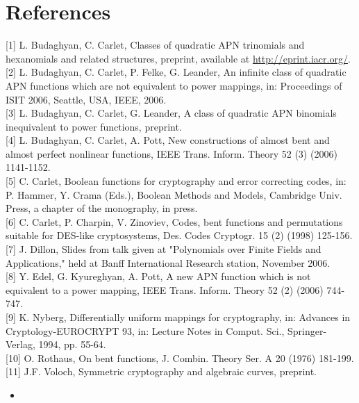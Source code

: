 \documentclass[10pt]{article}
\begin{document}
\section*{References}
[1] L. Budaghyan, C. Carlet, Classes of quadratic APN trinomials and hexanomials and related structures, preprint, available at \href{http://eprint.iacr.org/}{http://eprint.iacr.org/}.\\[0pt]
[2] L. Budaghyan, C. Carlet, P. Felke, G. Leander, An infinite class of quadratic APN functions which are not equivalent to power mappings, in: Proceedings of ISIT 2006, Seattle, USA, IEEE, 2006.\\[0pt]
[3] L. Budaghyan, C. Carlet, G. Leander, A class of quadratic APN binomials inequivalent to power functions, preprint.\\[0pt]
[4] L. Budaghyan, C. Carlet, A. Pott, New constructions of almost bent and almost perfect nonlinear functions, IEEE Trans. Inform. Theory 52 (3) (2006) 1141-1152.\\[0pt]
[5] C. Carlet, Boolean functions for cryptography and error correcting codes, in: P. Hammer, Y. Crama (Eds.), Boolean Methods and Models, Cambridge Univ. Press, a chapter of the monography, in press.\\[0pt]
[6] C. Carlet, P. Charpin, V. Zinoviev, Codes, bent functions and permutations suitable for DES-like cryptosystems, Des. Codes Cryptogr. 15 (2) (1998) 125-156.\\[0pt]
[7] J. Dillon, Slides from talk given at "Polynomials over Finite Fields and Applications," held at Banff International Research station, November 2006.\\[0pt]
[8] Y. Edel, G. Kyureghyan, A. Pott, A new APN function which is not equivalent to a power mapping, IEEE Trans. Inform. Theory 52 (2) (2006) 744-747.\\[0pt]
[9] K. Nyberg, Differentially uniform mappings for cryptography, in: Advances in Cryptology-EUROCRYPT 93, in: Lecture Notes in Comput. Sci., Springer-Verlag, 1994, pp. 55-64.\\[0pt]
[10] O. Rothaus, On bent functions, J. Combin. Theory Ser. A 20 (1976) 181-199.\\[0pt]
[11] J.F. Voloch, Symmetric cryptography and algebraic curves, preprint.

\begin{itemize}
  \item 
\end{itemize}
\end{document}
